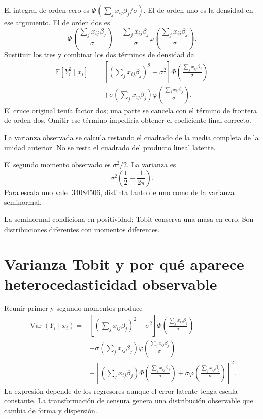 \documentclass[11pt,a4paper]{article}
\newcommand{\E}{\mathbb E}
\DeclareMathOperator{\Var}{Var}
\begin{document}
El integral de orden cero es
\(\Phi(\sum_jx_{ij}\beta_j/\sigma)\).
El de orden uno es la densidad
en ese argumento.
El de orden dos es
\[
\Phi\left(\frac{\sum_jx_{ij}\beta_j}{\sigma}\right)
-\frac{\sum_jx_{ij}\beta_j}{\sigma}
\varphi\left(\frac{\sum_jx_{ij}\beta_j}{\sigma}\right).
\]
Sustituir los tres y combinar
los dos términos de densidad da
\[
\begin{aligned}
\E[Y_i^2\mid x_i]
={}&\left[
\left(\sum_jx_{ij}\beta_j\right)^2+\sigma^2
\right]\Phi\left(\frac{\sum_jx_{ij}\beta_j}{\sigma}\right)\\
&+\sigma\left(\sum_jx_{ij}\beta_j\right)
\varphi\left(\frac{\sum_jx_{ij}\beta_j}{\sigma}\right).
\end{aligned}
\]
El cruce original tenía factor dos;
una parte se cancela con
el término de frontera de orden dos.
Omitir ese término impediría
obtener el coeficiente final correcto.

La varianza observada se calcula
restando el cuadrado de la
media completa de la unidad anterior.
No se resta el cuadrado
del producto lineal latente.

\begin{ejemplo}
El segundo momento observado es
\(\sigma^2/2\).
La varianza es
\[
\sigma^2\left(\frac12-\frac1{2\pi}\right).
\]
Para escala uno vale .34084506,
distinta tanto de uno
como de la varianza seminormal.
\end{ejemplo}
La seminormal condiciona en positividad;
Tobit conserva una masa en cero.
Son distribuciones diferentes
con momentos diferentes.

\clearpage
\section{Varianza Tobit y por qué aparece heterocedasticidad observable}\label{unidad87}
Reunir primer y segundo momentos produce
\[
\begin{aligned}
\Var(Y_i\mid x_i)
={}&\left[
\left(\sum_jx_{ij}\beta_j\right)^2+\sigma^2
\right]\Phi\left(\frac{\sum_jx_{ij}\beta_j}{\sigma}\right)\\
&+\sigma\left(\sum_jx_{ij}\beta_j\right)
\varphi\left(\frac{\sum_jx_{ij}\beta_j}{\sigma}\right)\\
&-\left[
\left(\sum_jx_{ij}\beta_j\right)
\Phi\left(\frac{\sum_jx_{ij}\beta_j}{\sigma}\right)
+\sigma\varphi\left(\frac{\sum_jx_{ij}\beta_j}{\sigma}\right)
\right]^2.
\end{aligned}
\]
La expresión depende de los
regresores aunque el error latente
tenga escala constante.
La transformación de censura
genera una distribución observable
que cambia de forma y dispersión.
\end{document}
